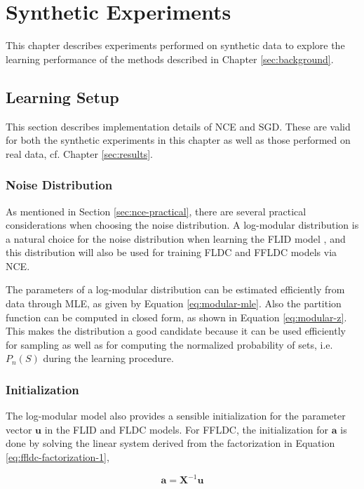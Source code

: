 \chapter{Synthetic Experiments}
\label{sec:synthetic}

This chapter describes experiments performed on synthetic data to explore the learning performance of the methods described in Chapter \ref{sec:background}.

\section{Learning Setup}

This section describes implementation details of NCE and SGD. These are valid for both the synthetic experiments in this chapter as well as those performed on real data, cf. Chapter \ref{sec:results}.

\subsection{Noise Distribution}

As mentioned in Section \ref{sec:nce-practical}, there are several practical considerations when choosing the noise distribution. A log-modular distribution is a natural choice for the noise distribution when learning the FLID model \citep{tschiatschek16learning}, and this distribution will also be used for training FLDC and FFLDC models via NCE.

The parameters of a log-modular distribution can be estimated efficiently from data through MLE, as given by Equation \eqref{eq:modular-mle}. Also the partition function can be computed in closed form, as shown in Equation \eqref{eq:modular-z}. This makes the distribution a good candidate because it can be used efficiently for sampling as well as for computing the normalized probability of sets, i.e. $P_{n}(S)$ during the learning procedure.

\subsection{Initialization}

The log-modular model also provides a sensible initialization for the parameter vector $\mathbf{u}$ in the FLID and FLDC models. For FFLDC, the initialization for $\mathbf{a}$ is done by solving the linear system derived from the factorization in Equation \eqref{eq:ffldc-factorization-1},

\begin{equation}
  \label{eq:modular_features}
  \mathbf{a} = \mathbf{X}^{-1}\mathbf{u}
\end{equation}

